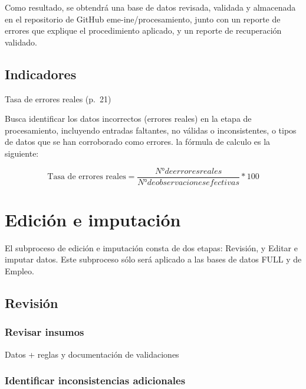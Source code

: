 \documentclass[
]{article}
\begin{document}
Como resultado, se obtendrá una base de datos revisada, validada y almacenada en el repositorio de GitHub eme-ine/procesamiento, junto con un reporte de errores que explique el procedimiento aplicado, y un reporte de recuperación validado.

\hypertarget{indicadores}{%
\subsection{Indicadores}\label{indicadores}}

Tasa de errores reales (p.~21)

Busca identificar los datos incorrectos (errores reales) en la etapa de procesamiento, incluyendo entradas faltantes, no válidas o inconsistentes, o tipos de datos que se han corroborado como errores. la fórmula de calculo es la siguiente:

\[\text{Tasa de errores reales} = \frac {N° de errores reales}{N° de observaciones efectivas}*100\]

\newpage

\hypertarget{ediciuxf3n-e-imputaciuxf3n}{%
\section{Edición e imputación}\label{ediciuxf3n-e-imputaciuxf3n}}

El subproceso de edición e imputación consta de dos etapas: Revisión, y Editar e imputar datos. Este subproceso sólo será aplicado a las bases de datos FULL y de Empleo.

\hypertarget{revisiuxf3n}{%
\subsection{Revisión}\label{revisiuxf3n}}

\hypertarget{revisar-insumos-1}{%
\subsubsection{Revisar insumos}\label{revisar-insumos-1}}

Datos + reglas y documentación de validaciones

\hypertarget{identificar-inconsistencias-adicionales}{%
\subsubsection{Identificar inconsistencias adicionales}\label{identificar-inconsistencias-adicionales}}
\end{document}
